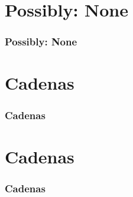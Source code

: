 \documentclass{beamer}
\begin{document}
\section{Possibly: None}
\begin{frame}[fragile]
  \frametitle{Possibly: None}
  
\end{frame}

\section{Cadenas}
\begin{frame}[fragile]
  \frametitle{Cadenas}
  
\end{frame}

\section{Cadenas}
\begin{frame}[fragile]
  \frametitle{Cadenas}
  
\end{frame}
\end{document}
